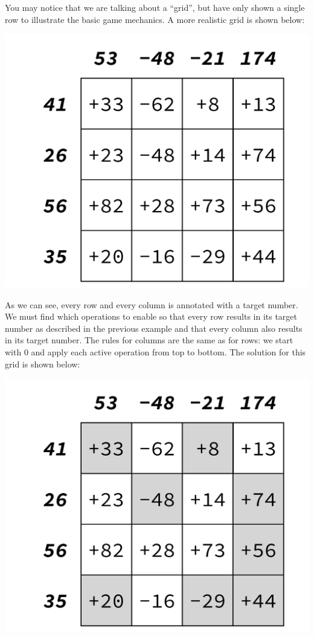 You may notice that we are talking about a ``grid'', but have only shown a single row to illustrate the basic game mechanics. A more realistic grid is shown below:
\begin{center}
	\includegraphics[scale=0.4,trim=0 30 0 30]{cswk/lac2.pdf}
\end{center}
As we can see, every row and every column is annotated with a target number. We must find which operations to enable so that every row results in its target number as described in the previous example and that every column also results in its target number. The rules for columns are the same as for rows: we start with 0 and apply each active operation from top to bottom. The solution for this grid is shown below:
\begin{center}
	\includegraphics[scale=0.4,trim=0 30 0 30]{cswk/lac2c.pdf}
\end{center} 
